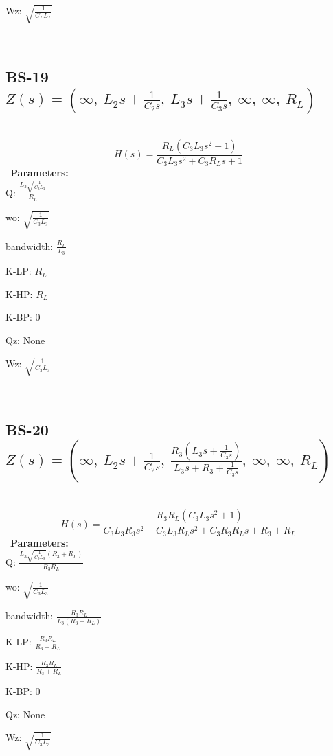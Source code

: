\documentclass{article}
\begin{document}
Wz: $\sqrt{\frac{1}{C_{L} L_{L}}}$\ 

\ 

\subsection{BS-19 $Z(s) = \left( \infty, \  L_{2} s + \frac{1}{C_{2} s}, \  L_{3} s + \frac{1}{C_{3} s}, \  \infty, \  \infty, \  R_{L}\right)$ } \ 
\textbf{\[H(s) = \frac{R_{L} \left(C_{3} L_{3} s^{2} + 1\right)}{C_{3} L_{3} s^{2} + C_{3} R_{L} s + 1}\] } \ 
\textbf{Parameters:}\\ 

Q: $\frac{L_{3} \sqrt{\frac{1}{C_{3} L_{3}}}}{R_{L}}$\ 

wo: $\sqrt{\frac{1}{C_{3} L_{3}}}$\ 

bandwidth: $\frac{R_{L}}{L_{3}}$\ 

K-LP: $R_{L}$\ 

K-HP: $R_{L}$\ 

K-BP: $0$\ 

Qz: $\text{None}$\ 

Wz: $\sqrt{\frac{1}{C_{3} L_{3}}}$\ 

\ 

\subsection{BS-20 $Z(s) = \left( \infty, \  L_{2} s + \frac{1}{C_{2} s}, \  \frac{R_{3} \left(L_{3} s + \frac{1}{C_{3} s}\right)}{L_{3} s + R_{3} + \frac{1}{C_{3} s}}, \  \infty, \  \infty, \  R_{L}\right)$ } \ 
\textbf{\[H(s) = \frac{R_{3} R_{L} \left(C_{3} L_{3} s^{2} + 1\right)}{C_{3} L_{3} R_{3} s^{2} + C_{3} L_{3} R_{L} s^{2} + C_{3} R_{3} R_{L} s + R_{3} + R_{L}}\] } \ 
\textbf{Parameters:}\\ 

Q: $\frac{L_{3} \sqrt{\frac{1}{C_{3} L_{3}}} \left(R_{3} + R_{L}\right)}{R_{3} R_{L}}$\ 

wo: $\sqrt{\frac{1}{C_{3} L_{3}}}$\ 

bandwidth: $\frac{R_{3} R_{L}}{L_{3} \left(R_{3} + R_{L}\right)}$\ 

K-LP: $\frac{R_{3} R_{L}}{R_{3} + R_{L}}$\ 

K-HP: $\frac{R_{3} R_{L}}{R_{3} + R_{L}}$\ 

K-BP: $0$\ 

Qz: $\text{None}$\ 

Wz: $\sqrt{\frac{1}{C_{3} L_{3}}}$\ 

\ 
\end{document}
